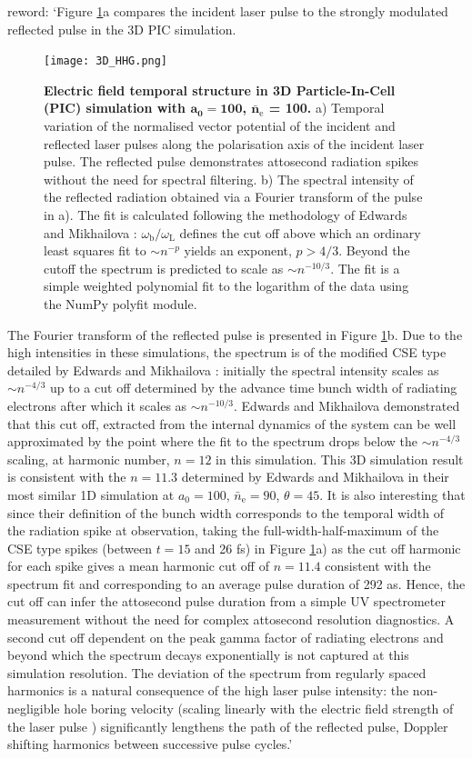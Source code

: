 reword:
`Figure \ref{fig:3D_HHG}a compares the incident laser pulse to the strongly modulated reflected pulse in the 3D PIC simulation. 
\begin{figure}
	\centering
	\texttt{[image: 3D\_HHG.png]}
	\caption{\textbf{Electric field temporal structure in 3D Particle-In-Cell (PIC) simulation with $\mathbf{a_0 = 100}$, $\mathbf{\bar{n}_\mathrm{e}}$ = 100.} a) Temporal variation of the normalised vector potential of the incident and reflected laser pulses along the polarisation axis of the incident laser pulse. The reflected pulse demonstrates attosecond radiation spikes without the need for spectral filtering. b) The spectral intensity of the reflected radiation obtained via a Fourier transform of the pulse in a). The fit is calculated following the methodology of Edwards and Mikhailova \cite{edwards2020x}: $\omega_\mathrm{b}/\omega_\mathrm{L}$ defines the cut off above which an ordinary least squares fit to $\sim n^{-p}$ yields an exponent, $p > 4/3$. Beyond the cutoff the spectrum is predicted to scale as $\sim n^{-10/3}$. The fit is a simple weighted polynomial fit to the logarithm of the data using the NumPy polyfit module.}
	\label{fig:3D_HHG}
\end{figure}
The Fourier transform of the reflected pulse is presented in Figure \ref{fig:3D_HHG}b. Due to the high intensities in these simulations, the spectrum is of the modified CSE type detailed by Edwards and Mikhailova \cite{edwards2020x}: initially the spectral intensity scales as $\sim n^{-4/3}$ up to a cut off determined by the advance time bunch width of radiating electrons after which it scales as $\sim n^{-10/3}$. Edwards and Mikhailova demonstrated that this cut off, extracted from the internal dynamics of the system can be well approximated by the point where the fit to the spectrum drops below the $\sim n^{-4/3}$ scaling, at harmonic number, $n = 12$ in this simulation. This 3D simulation result is consistent with the $n = 11.3$ determined by Edwards and Mikhailova in their most similar 1D simulation at $a_0 =100$, $\bar{n}_\mathrm{e} = 90$, $\theta = 45$\degree. It is also interesting that since their definition of the bunch width corresponds to the temporal width of the radiation spike at observation, taking the full-width-half-maximum of the CSE type spikes (between $t = 15$ and 26 fs) in Figure \ref{fig:3D_HHG}a) as the cut off harmonic for each spike gives a mean harmonic cut off of $n = 11.4$ consistent with the spectrum fit and corresponding to an average pulse duration of 292 as. Hence, the cut off can infer the attosecond pulse duration from a simple UV spectrometer measurement without the need for complex attosecond resolution diagnostics. A second cut off dependent on the peak gamma factor of radiating electrons and beyond which the spectrum decays exponentially is not captured at this simulation resolution. The deviation of the spectrum from regularly spaced harmonics is a natural consequence of the high laser pulse intensity: the non-negligible hole boring velocity (scaling linearly with the electric field strength of the laser pulse \cite{robinsonRelativisticallyCorrectHoleboring2009}) significantly lengthens the path of the reflected pulse, Doppler shifting harmonics between successive pulse cycles.'

